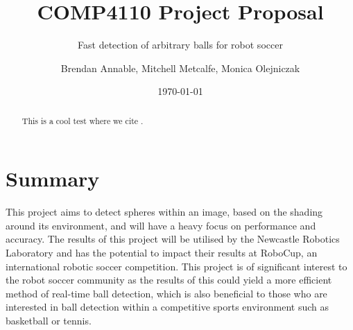 \documentclass[11pt]{scrartcl} %
\title{COMP4110 Project Proposal}
\subtitle{Fast detection of arbitrary balls for robot soccer}
\author{ Brendan Annable, Mitchell Metcalfe, Monica Olejniczak }
\date{\today}
\begin{document}
	\maketitle

	\begin{abstract}
		
		This is a cool test where we cite \citep{Yuan2015}.
		
	\end{abstract}

	\newpage
	\tableofcontents
	\newpage

	\section{Summary} {

		This project aims to detect spheres within an image, based on the shading around its environment, and will have a heavy focus on performance and accuracy. The results of this project will be utilised by the Newcastle Robotics Laboratory and has the potential to impact their results at RoboCup, an international robotic soccer competition. This project is of significant interest to the robot soccer community as the results of this could yield a more efficient method of real-time ball detection, which is also beneficial to those who are interested in ball detection within a competitive sports environment such as basketball or tennis.
		
	}
\end{document}
